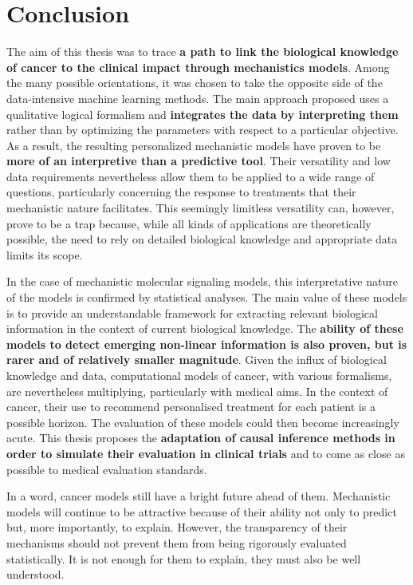 \documentclass[a4paper,12pt,twoside,onecolumn,openright,final,oldfontcommands]{memoir}
\begin{document}
\chapter*{Conclusion}\label{conclusion}

The aim of this thesis was to trace \textbf{a path to link the
biological knowledge of cancer to the clinical impact through
mechanistics models}. Among the many possible orientations, it was
chosen to take the opposite side of the data-intensive machine learning
methods. The main approach proposed uses a qualitative logical formalism
and \textbf{integrates the data by interpreting them} rather than by
optimizing the parameters with respect to a particular objective. As a
result, the resulting personalized mechanistic models have proven to be
\textbf{more of an interpretive than a predictive tool}. Their
versatility and low data requirements nevertheless allow them to be
applied to a wide range of questions, particularly concerning the
response to treatments that their mechanistic nature facilitates. This
seemingly limitless versatility can, however, prove to be a trap
because, while all kinds of applications are theoretically possible, the
need to rely on detailed biological knowledge and appropriate data
limits its scope.

In the case of mechanistic molecular signaling models, this
interpretative nature of the models is confirmed by statistical
analyses. The main value of these models is to provide an understandable
framework for extracting relevant biological information in the context
of current biological knowledge. The \textbf{ability of these models to
detect emerging non-linear information is also proven, but is rarer and
of relatively smaller magnitude}. Given the influx of biological
knowledge and data, computational models of cancer, with various
formalisms, are nevertheless multiplying, particularly with medical
aims. In the context of cancer, their use to recommend personalised
treatment for each patient is a possible horizon. The evaluation of
these models could then become increasingly acute. This thesis proposes
the \textbf{adaptation of causal inference methods in order to simulate
their evaluation in clinical trials} and to come as close as possible to
medical evaluation standards.

In a word, cancer models still have a bright future ahead of them.
Mechanistic models will continue to be attractive because of their
ability not only to predict but, more importantly, to explain. However,
the transparency of their mechanisms should not prevent them from being
rigorously evaluated statistically. It is not enough for them to
explain, they must also be well understood.
\end{document}
